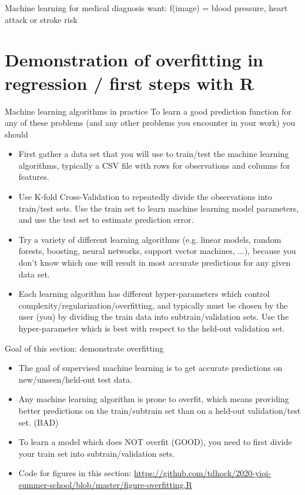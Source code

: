 \documentclass[12pt]{article}
\begin{document}
{Machine learning for medical diagnosis}
want: f(image) = blood pressure, heart attack or stroke risk

\section{Demonstration of overfitting in regression /
  first steps with R}

{Machine learning algorithms in practice}
To learn a good prediction function for any of these problems (and
any other problems you encounter in your work) you should
\begin{itemize}
\item First gather a data set that you will use to train/test the
  machine learning algorithms, typically a CSV file with rows for
  observations and columns for features.
\item Use K-fold Cross-Validation to repeatedly divide the
  observations into train/test sets. Use the train set to learn
  machine learning model parameters, and use the test set to
  estimate prediction error.
\item Try a variety of different learning algorithms (e.g. linear
  models, random forests, boosting, neural networks, support vector
  machines, ...), because you don't know which one will result in
  most accurate predictions for any given data set. 
\item Each learning algorithm has different hyper-parameters which
  control complexity/regularization/overfitting, and typically must
  be chosen by the user (you) by dividing the train data into
  subtrain/validation sets. Use the hyper-parameter which is
  best with respect to the held-out validation set.
\end{itemize}

{Goal of this section: demonstrate overfitting}
\begin{itemize}
\item The goal of supervised machine learning is to get accurate
  predictions on new/unseen/held-out test data.
\item Any machine learning algorithm is prone to overfit, which
  means providing better predictions on the train/subtrain set than
  on a held-out validation/test set. (BAD)
\item To learn a model which does NOT overfit (GOOD), you need to
  first divide your train set into subtrain/validation sets.
\item Code for figures in this section:
  \url{https://github.com/tdhock/2020-yiqi-summer-school/blob/master/figure-overfitting.R}
\end{itemize}
\end{document}
